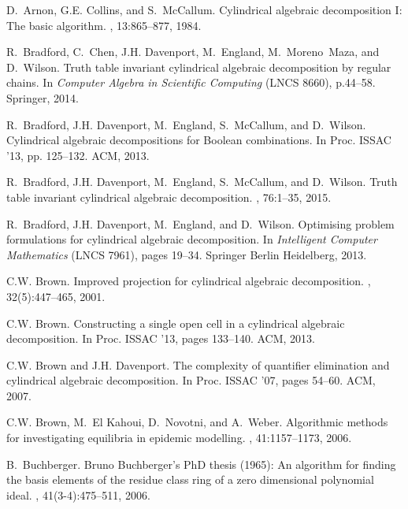 \documentclass{llncs}
\begin{document}

\begin{thebibliography}{10}

D.~Arnon, G.E. Collins, and S.~McCallum.
\newblock Cylindrical algebraic decomposition {I}: The basic algorithm.
, 13:865--877, 1984.

R.~Bradford, C.~Chen, J.H. Davenport, M.~England, M.~{Moreno~Maza}, and
  D.~Wilson.
\newblock Truth table invariant cylindrical algebraic decomposition by regular
  chains.
\newblock In {\em Computer Algebra in Scientific Computing} (LNCS 8660), p.44--58. Springer, 2014.

R.~Bradford, J.H. Davenport, M.~England, S.~McCallum, and D.~Wilson.
\newblock Cylindrical algebraic decompositions for {B}oolean combinations.
\newblock In {Proc. ISSAC '13}, pp. 125--132. ACM,
  2013.

R.~Bradford, J.H. Davenport, M.~England, S.~McCallum, and D.~Wilson.
\newblock Truth table invariant cylindrical algebraic decomposition.
, 76:1--35, 2015.

R.~Bradford, J.H. Davenport, M.~England, and D.~Wilson.
\newblock Optimising problem formulations for cylindrical algebraic
  decomposition.
\newblock In {\em Intelligent Computer Mathematics} (LNCS 7961), pages 19--34. Springer Berlin Heidelberg, 2013.

C.W. Brown.
\newblock Improved projection for cylindrical algebraic decomposition.
, 32(5):447--465, 2001.

C.W. Brown.
\newblock Constructing a single open cell in a cylindrical algebraic
  decomposition.
\newblock In {Proc. ISSAC '13}, pages 133--140. ACM,
  2013.

C.W. Brown and J.H. Davenport.
\newblock The complexity of quantifier elimination and cylindrical algebraic
  decomposition.
\newblock In {Proc. ISSAC '07}, pages 54--60. ACM,
  2007.

C.W. Brown, M.~El Kahoui, D.~Novotni, and A.~Weber.
\newblock Algorithmic methods for investigating equilibria in epidemic
  modelling.
, 41:1157--1173, 2006.

B.~Buchberger.
\newblock Bruno {B}uchberger's {PhD} thesis (1965): {A}n algorithm for finding
  the basis elements of the residue class ring of a zero dimensional polynomial
  ideal.
, 41(3-4):475--511, 2006.


\end{thebibliography}
\end{document}
